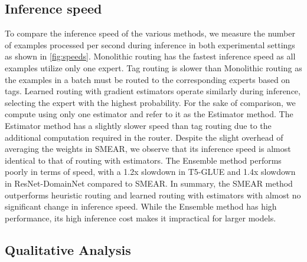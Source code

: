 \documentclass{article}
\theoremstyle{plain}
\theoremstyle{definition}
\theoremstyle{remark}
\begin{document}
\subsection{Inference speed}
\label{sec:speed}

To compare the inference speed of the various methods, we measure the number of examples processed per second during inference in both experimental settings as shown in \cref{fig:speeds}.
Monolithic routing has the fastest inference speed as all examples utilize only one expert. 
Tag routing is slower than Monolithic routing as the examples in a batch must be routed to the corresponding experts based on tags. 
Learned routing with gradient estimators operate similarly during inference, selecting the expert with the highest probability. 
For the sake of comparison, we compute using only one estimator and refer to it as the Estimator method. 
The Estimator method has a slightly slower speed than tag routing due to the additional computation required in the router.
Despite the slight overhead of averaging the weights in SMEAR, we observe that its inference speed is almost identical to that of routing with estimators.
The Ensemble method performs poorly in terms of speed, with a 1.2x slowdown in T5-GLUE and 1.4x slowdown in ResNet-DomainNet compared to SMEAR. 
In summary, the SMEAR method outperforms heuristic routing and learned routing with estimators with almost no significant change in inference speed. 
While the Ensemble method has high performance, its high inference cost makes it impractical for larger models.

\subsection{Qualitative Analysis}
\label{sec:qualitative}
\end{document}
